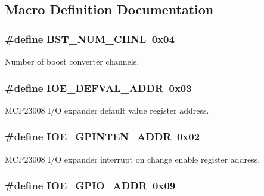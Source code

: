 \subsection{Macro Definition Documentation}
\hypertarget{a00008_ac36a77a8d07d8025000e3e748cea40dd}{
\subsubsection[{B\-S\-T\-\_\-\-N\-U\-M\-\_\-\-C\-H\-N\-L}]{\setlength{\rightskip}{0pt plus 5cm}\#define B\-S\-T\-\_\-\-N\-U\-M\-\_\-\-C\-H\-N\-L~0x04}}\label{a00008_ac36a77a8d07d8025000e3e748cea40dd}
Number of boost converter channels. \hypertarget{a00008_a687e15212e8d4b49c12159dce73eeeab}{
\subsubsection[{I\-O\-E\-\_\-\-D\-E\-F\-V\-A\-L\-\_\-\-A\-D\-D\-R}]{\setlength{\rightskip}{0pt plus 5cm}\#define I\-O\-E\-\_\-\-D\-E\-F\-V\-A\-L\-\_\-\-A\-D\-D\-R~0x03}}\label{a00008_a687e15212e8d4b49c12159dce73eeeab}
M\-C\-P23008 I/\-O expander default value register address. \hypertarget{a00008_aa68be5a6ed28fb146600b4fd2d11fafd}{
\subsubsection[{I\-O\-E\-\_\-\-G\-P\-I\-N\-T\-E\-N\-\_\-\-A\-D\-D\-R}]{\setlength{\rightskip}{0pt plus 5cm}\#define I\-O\-E\-\_\-\-G\-P\-I\-N\-T\-E\-N\-\_\-\-A\-D\-D\-R~0x02}}\label{a00008_aa68be5a6ed28fb146600b4fd2d11fafd}
M\-C\-P23008 I/\-O expander interrupt on change enable register address. \hypertarget{a00008_af2d85152c5775a221f107d6de547bca1}{
\subsubsection[{I\-O\-E\-\_\-\-G\-P\-I\-O\-\_\-\-A\-D\-D\-R}]{\setlength{\rightskip}{0pt plus 5cm}\#define I\-O\-E\-\_\-\-G\-P\-I\-O\-\_\-\-A\-D\-D\-R~0x09}}\label{a00008_af2d85152c5775a221f107d6de547bca1}
